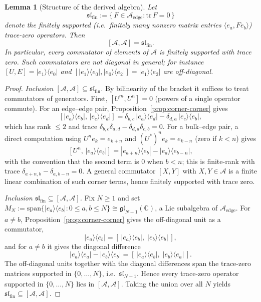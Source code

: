 \documentclass[10pt,a4paper]{amsart}
\newtheorem{lemma}{Lemma}
\begin{document}
\begin{lemma}[Structure of the derived algebra]\label{lem:commutators-diagonal}
Let
\[
\mathfrak{sl}_{\mathrm{fin}} := \bigl\{\, F \in \mathcal{A}_{\mathrm{edge}}
: \mathrm{tr}\,F = 0 \,\bigr\}
\]
denote the finitely supported (i.e.\ finitely many nonzero matrix entries
$\langle e_a,Fe_b\rangle$) trace-zero operators. Then
\[
[\mathcal{A},\mathcal{A}] = \mathfrak{sl}_{\mathrm{fin}}.
\]
In particular, every commutator of elements of $\mathcal{A}$ is finitely supported with trace
zero. Such commutators are \emph{not} diagonal in general; for instance
$[U,E]=|e_1\rangle\langle e_0|$ and
$[|e_1\rangle\langle e_0|,|e_0\rangle\langle e_2|]=|e_1\rangle\langle e_2|$ are off-diagonal.
\end{lemma}

\begin{proof}
\emph{Inclusion $[\mathcal{A},\mathcal{A}] \subseteq \mathfrak{sl}_{\mathrm{fin}}$.}
By bilinearity of the bracket it suffices to treat commutators of generators. First,
$[U^m,U^n]=0$ (powers of a single operator commute). For an edge--edge pair,
Proposition~\ref{prop:corner-corner} gives
\[
[|e_a\rangle\langle e_b|,\,|e_c\rangle\langle e_d|]
= \delta_{b,c}\,|e_a\rangle\langle e_d| - \delta_{d,a}\,|e_c\rangle\langle e_b|,
\]
which has rank $\le 2$ and trace $\delta_{b,c}\delta_{a,d} - \delta_{d,a}\delta_{c,b} = 0$.
For a bulk--edge pair, a direct computation using $U^n e_k = e_{k+n}$ and
$(U^*)^n e_k = e_{k-n}$ (zero if $k<n$) gives
\begin{equation}\label{eq:bulk-edge-comm}
[U^n,\,|e_a\rangle\langle e_b|]
= |e_{a+n}\rangle\langle e_b| - |e_a\rangle\langle e_{b-n}|,
\end{equation}
with the convention that the second term is $0$ when $b<n$; this is finite-rank with trace
$\delta_{a+n,b}-\delta_{a,b-n} = 0$. A general commutator $[X,Y]$ with $X,Y\in\mathcal{A}$ is a
finite linear combination of such corner terms, hence finitely supported with trace zero.

\emph{Inclusion $\mathfrak{sl}_{\mathrm{fin}} \subseteq [\mathcal{A},\mathcal{A}]$.}
Fix $N\ge 1$ and set $M_N := \mathrm{span}\{|e_a\rangle\langle e_b| : 0 \le a,b \le N\}
\cong \mathfrak{gl}_{N+1}(\mathbb{C})$, a Lie subalgebra of $\mathcal{A}_{\mathrm{edge}}$. For
$a\ne b$, Proposition~\ref{prop:corner-corner} gives the off-diagonal unit as a commutator,
\[
|e_a\rangle\langle e_b| = [\,|e_a\rangle\langle e_b|,\;|e_b\rangle\langle e_b|\,],
\]
and for $a\ne b$ it gives the diagonal difference
\[
|e_a\rangle\langle e_a| - |e_b\rangle\langle e_b|
= [\,|e_a\rangle\langle e_b|,\;|e_b\rangle\langle e_a|\,].
\]
The off-diagonal units together with the diagonal differences span the trace-zero matrices
supported in $\{0,\dots,N\}$, i.e.\ $\mathfrak{sl}_{N+1}$. Hence every trace-zero operator
supported in $\{0,\dots,N\}$ lies in $[\mathcal{A},\mathcal{A}]$. Taking the union over all $N$
yields $\mathfrak{sl}_{\mathrm{fin}} \subseteq [\mathcal{A},\mathcal{A}]$.
\end{proof}
\end{document}
